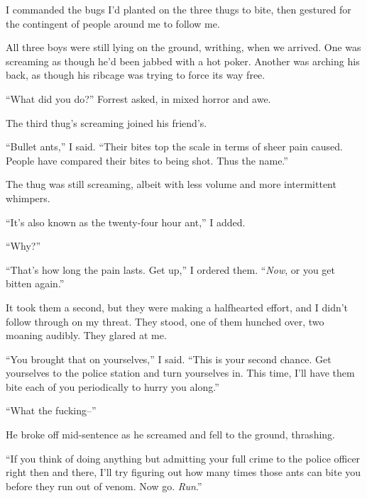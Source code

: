 I commanded the bugs I'd planted on the three thugs to bite, then gestured for the contingent of people around me to follow me.



All three boys were still lying on the ground, writhing, when we arrived.  One was screaming as though he'd been jabbed with a hot poker.  Another was arching his back, as though his ribcage was trying to force its way free.



``What did you do?''  Forrest asked, in mixed horror and awe.



The third thug's screaming joined his friend's.



``Bullet ants,'' I said.  ``Their bites top the scale in terms of sheer pain caused.  People have compared their bites to being shot.  Thus the name.''



The thug was still screaming, albeit with less volume and more intermittent whimpers.



``It's also known as the twenty-four hour ant,'' I added.



``Why?''



``That's how long the pain lasts.  Get up,'' I ordered them.  ``\emph{Now}, or you get bitten again.''



It took them a second, but they were making a halfhearted effort, and I didn't follow through on my threat.  They stood, one of them hunched over, two moaning audibly.  They glared at me.



``You brought that on yourselves,'' I said.  ``This is your second chance.  Get yourselves to the police station and turn yourselves in.  This time, I'll have them bite each of you periodically to hurry you along.''



``What the fucking--''



He broke off mid-sentence as he screamed and fell to the ground, thrashing.



``If you think of doing anything but admitting your full crime to the police officer right then and there, I'll try figuring out how many times those ants can bite you before they run out of venom.  Now go.  \emph{Run}.''




